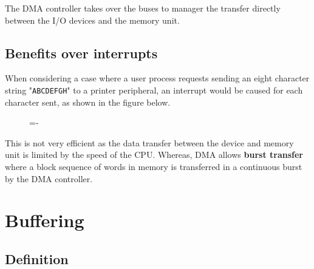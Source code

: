 \documentclass[a4paper]{systems-software}
\begin{document}
The DMA controller takes over the buses to manager the transfer directly between the I/O devices and the memory unit.


\subsection*{Benefits over interrupts}

When considering a case where a user process requests sending an eight character string "\texttt{ABCDEFGH}" to a printer peripheral, an interrupt would be caused for each character sent, as shown in the figure below.

\begin{figure}[H]
  \lineskip=-\fboxrule
\end{figure}

This is not very efficient as the data transfer between the device and memory unit is limited by the speed of the CPU. Whereas, DMA allows \textbf{burst transfer} where a block sequence of words in memory is transferred in a continuous burst by the DMA controller.


\section*{Buffering}

\subsection*{Definition}
\end{document}
